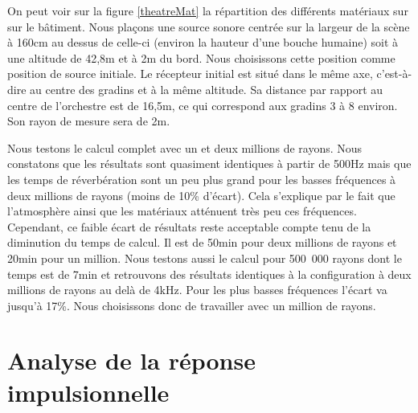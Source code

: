 On peut voir sur la figure \ref{theatreMat} la répartition des différents matériaux sur sur le bâtiment. Nous plaçons une source sonore centrée sur la largeur de la scène à 160cm au dessus de celle-ci (environ la hauteur d'une bouche humaine) soit à une altitude de 42,8m et à 2m du bord. Nous choisissons cette position comme position de source initiale. Le récepteur initial est situé dans le même axe, c'est-à-dire au centre des gradins et à la même altitude. Sa distance par rapport au centre de l'orchestre est de 16,5m, ce qui correspond aux gradins 3 à 8 environ. Son rayon de mesure sera de 2m. 

Nous testons le calcul complet avec un et deux millions de rayons. Nous constatons que les résultats sont quasiment identiques à partir de 500Hz mais que les temps de réverbération sont un peu plus grand pour les basses fréquences à deux millions de rayons (moins de 10\% d'écart). Cela s'explique par le fait que l'atmosphère ainsi que les matériaux atténuent très peu ces fréquences. Cependant, ce faible écart de résultats reste acceptable compte tenu de la diminution du temps de calcul. Il est de 50min pour deux millions de rayons et 20min pour un million. Nous testons aussi le calcul pour 500~000 rayons dont le temps est de 7min et retrouvons des résultats identiques à la configuration à deux millions de rayons au delà de 4kHz. Pour les plus basses fréquences l'écart va jusqu'à 17\%. Nous choisissons donc de travailler avec un million de rayons.



\section{Analyse de la réponse impulsionnelle}


